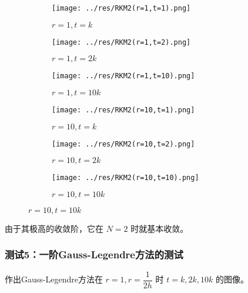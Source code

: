 \documentclass[lang=cn,a4paper,newtx,bibend=bibtex]{elegantpaper}
\begin{document}
\begin{figure}[H]
    \centering
    \begin{subfigure}[b]{0.30\textwidth}
        \texttt{[image: ../res/RKM2(r=1,t=1).png]}
        \caption{$r=1, t=k$}
    \end{subfigure}
    \hfill
    \begin{subfigure}[b]{0.30\textwidth}
        \texttt{[image: ../res/RKM2(r=1,t=2).png]}
        \caption{$r=1, t=2k$}
    \end{subfigure}
    \hfill
    \begin{subfigure}[b]{0.30\textwidth}
        \texttt{[image: ../res/RKM2(r=1,t=10).png]}
        \caption{$r=1, t=10k$}
    \end{subfigure}
    \begin{subfigure}[b]{0.30\textwidth}
        \texttt{[image: ../res/RKM2(r=10,t=1).png]}
        \caption{$r=10, t=k$}
    \end{subfigure}
    \hfill
    \begin{subfigure}[b]{0.30\textwidth}
        \texttt{[image: ../res/RKM2(r=10,t=2).png]}
        \caption{$r=10, t=2k$}
    \end{subfigure}
    \hfill
    \begin{subfigure}[b]{0.30\textwidth}
        \texttt{[image: ../res/RKM2(r=10,t=10).png]}
        \caption{$r=10, t=10k$}
    \end{subfigure}
  \end{figure}

由于其极高的收敛阶，它在 $N=2$ 时就基本收敛。

\subsubsection{测试5：一阶Gauss-Legendre方法的测试}

作出Gauss-Legendre方法在 $r=1, r=\dfrac 1{2h}$ 时 $t=k,2k,10k$ 的图像。
\end{document}
